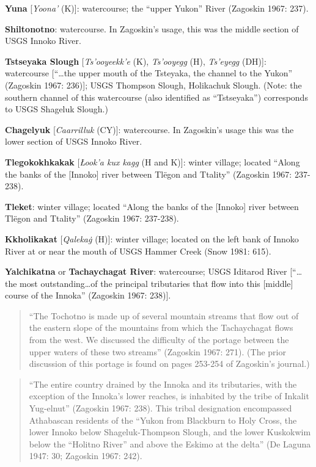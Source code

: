 \begin{hang}
\textbf{Yuna} [\textit{Yoona’} (K)]: watercourse; the “upper Yukon” River (Zagoskin 1967: 237).



\textbf{Shiltonotno}: watercourse. In Zagoskin’s usage, this was the middle section of USGS Innoko River.



\textbf{Tstseyaka Slough} [\textit{Ts’ooyeekk’e} (K), \textit{Ts’ooyegg} (H), \textit{Ts’eyegg} (DH)]: watercourse [``…the upper mouth of the Tsteyaka, the channel to the Yukon” (Zagoskin 1967: 236)]; USGS Thompson Slough, Holikachuk Slough. (Note: the southern channel of this watercourse (also identified as “Tstseyaka”) corresponds to USGS Shageluk Slough.)



\textbf{Chagelyuk} [\textit{Caarrilluk} (CY)]: watercourse. In Zagoskin’s usage this was the lower section of USGS Innoko River.



\textbf{Tlegokokhkakak} [\textit{Łook’a kux kagg} (H and K)]: winter village; located “Along the banks of the [Innoko] river between Tlëgon and Ttality” (Zagoskin 1967: 237-238).



\textbf{Tleket}: winter village; located “Along the banks of the [Innoko] river between Tlëgon and Ttality” (Zagoskin 1967: 237-238).



\textbf{Kkholikakat} [\textit{Qaleka\.g} (H)]: winter village; located on the left bank of Innoko River at or near the mouth of USGS Hammer Creek (Snow 1981: 615).



\textbf{Yalchikatna} or \textbf{Tachaychagat River}: watercourse; USGS Iditarod River [“…the most outstanding…of the principal tributaries that flow into this [middle] course of the Innoka” (Zagoskin 1967: 238)].



\begin{quote}“The Tochotno is made up of several mountain streams that flow out of the eastern slope of the mountains from which the Tachaychagat flows from the west. We discussed the difficulty of the portage between the upper waters of these two streams” (Zagoskin 1967: 271). (The prior discussion of this portage is found on pages 253-254 of Zagoskin’s journal.)
\end{quote}



\begin{quote}“The entire country drained by the Innoka and its tributaries, with the exception of the Innoka’s lower reaches, is inhabited by the tribe of Inkalit Yug-elnut” (Zagoskin 1967: 238). This tribal designation encompassed Athabascan residents of the “Yukon from Blackburn to Holy Cross, the lower Innoko below Shageluk-Thompson Slough, and the lower Kuskokwim below the “Holitno River” and above the Eskimo at the delta” (De Laguna 1947: 30; Zagoskin 1967: 242).
\end{quote}




\end{hang}

